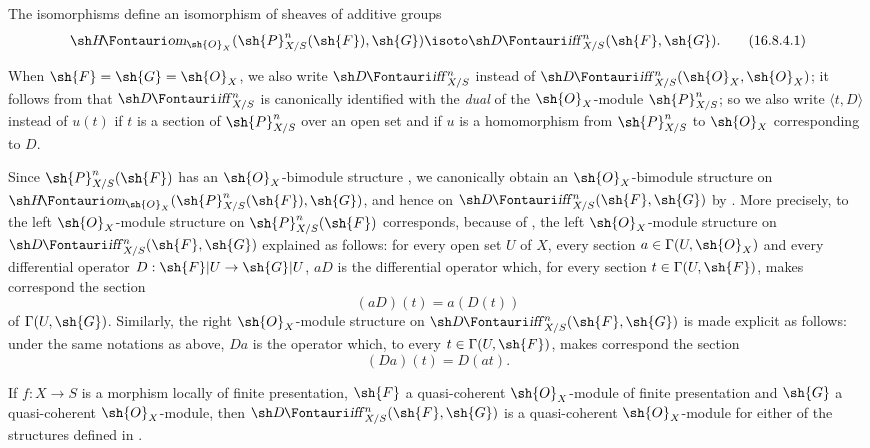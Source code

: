 \begin{proposition}[16.8.4]
\label{IV.16.8.4}
The isomorphisms  define an isomorphism of sheaves of additive groups
\[
  \label{IV.16.8.4.1}
  \shHom_{\sh{O}_X}(\sh{P}_{X/S}^n(\sh{F}), \sh{G}) \isoto \shDiff_{X/S}^n(\sh{F}, \sh{G}).
  \tag{16.8.4.1}
\]
\end{proposition}

When $\sh{F} = \sh{G} = \sh{O}_X$, we also write $\shDiff_{X/S}^n$ instead of $\shDiff_{X/S}^n(\sh{O}_X, \sh{O}_X)$;
it follows from  that $\shDiff_{X/S}^n$ is canonically identified with the \emph{dual} of the $\sh{O}_X$-module $\sh{P}_{X/S}^n$;
so we also write $\langle t, D \rangle$ instead of $u(t)$ if $t$ is a section of $\sh{P}_{X/S}^n$ over an open set and if $u$ is a homomorphism from $\sh{P}_{X/S}^n$ to $\sh{O}_X$ corresponding to $D$.

\begin{env}[16.8.5]
\label{IV.16.8.5}
Since $\sh{P}_{X/S}^n(\sh{F})$ has an $\sh{O}_X$-bimodule structure , we canonically obtain an $\sh{O}_X$-bimodule structure on $\shHom_{\sh{O}_X}(\sh{P}_{X/S}^n(\sh{F}), \sh{G})$, and hence on $\shDiff_{X/S}^n(\sh{F}, \sh{G})$ by .
More precisely, to the left $\sh{O}_X$-module structure on $\sh{P}_{X/S}^n(\sh{F})$ corresponds, because of , the left $\sh{O}_X$-module structure on $\shDiff_{X/S}^n(\sh{F}, \sh{G})$ explained as follows:
for every open set $U$ of $X$, every section $a \in \Gamma(U, \sh{O}_X)$ and every differential operator $D: \sh{F}|U \to \sh{G}|U$, $aD$ is the differential operator which, for every section $t \in \Gamma(U, \sh{F})$, makes correspond the section
\[
  \label{IV.16.8.5.1}
  (aD)(t) = a(D(t))
  \tag{16.8.5.1}
\]
of $\Gamma(U, \sh{G})$.
Similarly, the right $\sh{O}_X$-module structure on $\shDiff_{X/S}^n(\sh{F}, \sh{G})$ is made explicit as follows:
under the same notations as above, $Da$ is the operator which, to every $t \in \Gamma(U, \sh{F})$, makes correspond the section
\[
  \label{IV.16.8.5.2}
  (Da)(t) = D(at).
  \tag{16.8.5.2}
\]
\end{env}

\begin{proposition}[16.8.6]
\label{IV.16.8.6}
If $f:X \to S$ is a morphism locally of finite presentation, $\sh{F}$ a quasi-coherent $\sh{O}_X$-module of finite presentation and $\sh{G}$ a quasi-coherent $\sh{O}_X$-module, then $\shDiff_{X/S}^n(\sh{F}, \sh{G})$ is a quasi-coherent $\sh{O}_X$-module for either of the structures defined in .
\end{proposition}

